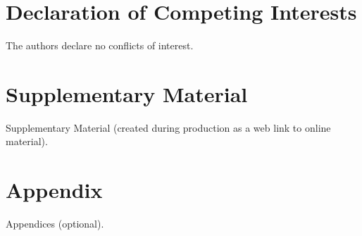 \documentclass[]{imag-ms-template}
\begin{document}
\section*{Declaration of Competing Interests}

The authors declare no conflicts of interest.

%

\section*{Supplementary Material}

Supplementary Material (created during production as a web link to online material).

\printbibliography

\appendix

\section{Appendix}

Appendices (optional).
\end{document}
